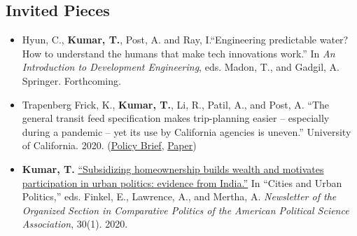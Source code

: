 \documentclass[10pt]{article}
\begin{document}
\subsection*{Invited Pieces}
\begin{itemize}
	\item[]Hyun, C., \textbf{Kumar, T.}, Post, A. and Ray, I.``Engineering predictable water? How to understand the humans that make tech innovations work.'' In \textit{An Introduction to Development Engineering}, eds. Madon, T., and Gadgil, A. Springer. Forthcoming.
\item[]Trapenberg Frick, K., \textbf{Kumar, T.}, Li, R., Patil, A., and Post, A. ``The general transit feed specification makes trip-planning easier -- especially during a pandemic -- yet its use by California agencies is uneven.'' University of California. 2020. (\href{https://escholarship.org/uc/item/9j94q60f}{Policy Brief}, \href{https://escholarship.org/uc/item/1f29b7dk}{Paper}) 
\item[]\textbf{Kumar, T.} \href{https://www.comparativepoliticsnewsletter.org/wp-content/uploads/2020/05/Spring-Newsletter-2020.pdf}{``Subsidizing homeownership builds wealth and motivates participation in urban politics: evidence from India.''}  In ``Cities and Urban Politics,'' eds. Finkel, E.,  Lawrence, A.,  and Mertha, A.  \textit{Newsletter of the Organized Section in Comparative Politics of the American Political Science Association}, 30(1). 2020.
	\end{itemize}
	
\end{document}
